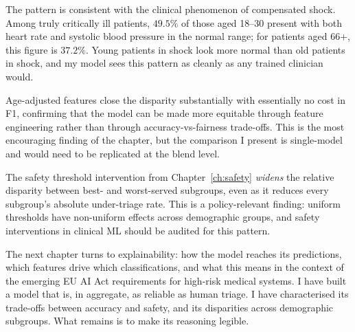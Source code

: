 The pattern is consistent with the clinical phenomenon of compensated shock. Among truly critically ill patients, $49.5\%$ of those aged 18--30 present with both heart rate and systolic blood pressure in the normal range; for patients aged 66+, this figure is $37.2\%$. Young patients in shock look more normal than old patients in shock, and my model sees this pattern as cleanly as any trained clinician would.

Age-adjusted features close the disparity substantially with essentially no cost in F1, confirming that the model can be made more equitable through feature engineering rather than through accuracy-vs-fairness trade-offs. This is the most encouraging finding of the chapter, but the comparison I present is single-model and would need to be replicated at the blend level.

The safety threshold intervention from Chapter~\ref{ch:safety} \emph{widens} the relative disparity between best- and worst-served subgroups, even as it reduces every subgroup's absolute under-triage rate. This is a policy-relevant finding: uniform thresholds have non-uniform effects across demographic groups, and safety interventions in clinical ML should be audited for this pattern.

The next chapter turns to explainability: how the model reaches its predictions, which features drive which classifications, and what this means in the context of the emerging EU AI Act requirements for high-risk medical systems. I have built a model that is, in aggregate, as reliable as human triage. I have characterised its trade-offs between accuracy and safety, and its disparities across demographic subgroups. What remains is to make its reasoning legible.
